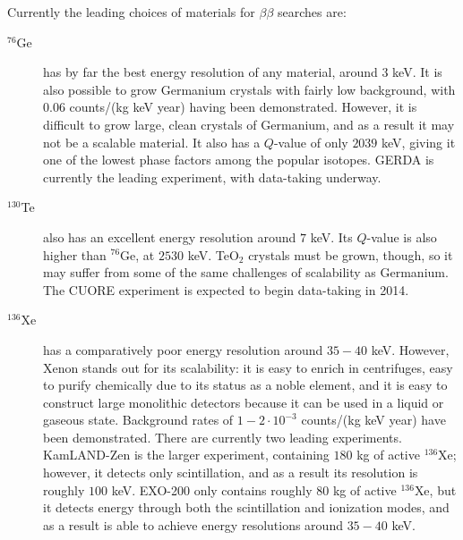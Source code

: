 Currently the leading choices of materials for $\beta\beta$ searches are:~\cite{RMPbb0n}
\begin{description}
\item[$^{76}$Ge] has by far the best energy resolution of any material, around $3$ keV.  It is also possible to grow Germanium crystals with fairly low background, with $0.06$ counts/(kg keV year) having been demonstrated.  However, it is difficult to grow large, clean crystals of Germanium, and as a result it may not be a scalable material.  It also has a $Q$-value of only $2039$ keV, giving it one of the lowest phase factors among the popular isotopes.  GERDA is currently the leading experiment, with data-taking underway.
\item[$^{130}$Te] also has an excellent energy resolution around $7$ keV.  Its $Q$-value is also higher than $^{76}$Ge, at $2530$ keV.  TeO$_2$ crystals must be grown, though, so it may suffer from some of the same challenges of scalability as Germanium.  The CUORE experiment is expected to begin data-taking in 2014.
\item[$^{136}$Xe] has a comparatively poor energy resolution around $35-40$ keV.  However, Xenon stands out for its scalability: it is easy to enrich in centrifuges, easy to purify chemically due to its status as a noble element, and it is easy to construct large monolithic detectors because it can be used in a liquid or gaseous state.  Background rates of $1-2\cdot 10^{-3}$ counts/(kg keV year) have been demonstrated.  There are currently two leading experiments.  KamLAND-Zen is the larger experiment, containing $180$ kg of active $^{136}$Xe; however, it detects only scintillation, and as a result its resolution is roughly $100$ keV.  EXO-200 only contains roughly $80$ kg of active $^{136}$Xe, but it detects energy through both the scintillation and ionization modes, and as a result is able to achieve energy resolutions around $35-40$ keV.
\end{description}

